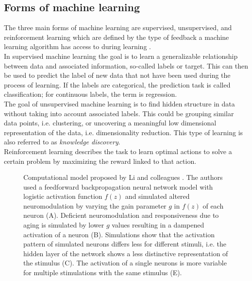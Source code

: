 \subsection{Forms of machine learning}
The three main forms of machine learning are supervised, unsupervised, and reinforcement learning which are defined by the type of feedback a machine learning algorithm has access to during learning \cite{Shalev2014}.\\
In supervised machine learning the goal is to learn a generalizable relationship between data and associated information, so-called labels or target. This can then be used to predict the label of new data that not have been used during the process of learning. If the labels are categorical, the prediction task is called classification; for continuous labels, the term is regression.\\
The goal of unsupervised machine learning is to find hidden structure in data without taking into account associated labels. This could be grouping similar data points, i.e. clustering, or uncovering a meaningful low dimensional representation of the data, i.e. dimensionality reduction. This type of learning is also referred to as \textit{knowledge discovery}\cite{Murphy2012}.\\
Reinforcement learning describes the task to learn optimal actions to solve a certain problem by maximizing the reward linked to that action.

\begin{figure}[h]
\def\svgwidth{\columnwidth}

\caption{Computational model proposed by Li and colleagues \cite{Li2000,Li2002}. The authors used a feedforward backpropagation neural network model with logistic activation function $f(z)$ and simulated altered neuromodulation by varying the gain parameter $g$ in $f(z)$ of each neuron (A). Deficient neuromodulation and responsiveness due to aging is simulated by lower $g$ values resulting in a dampened activation of a neuron (B). Simulations show that the activation pattern of simulated neurons differs less for different stimuli, i.e. the hidden layer of the network shows a less distinctive representation of the stimulus (C). The activation of a single neurons is more variable for multiple stimulations with the same stimulus (E).}
\label{fig:dedifferentiation}
\end{figure}

